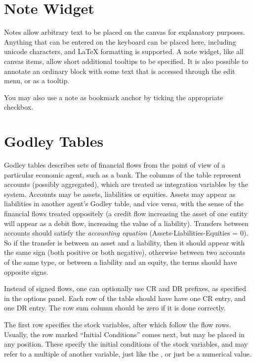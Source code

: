 \section{Note Widget}
\label{Notes}\label{Item} Notes allow arbitrary text to be
placed on the canvas for explanatory purposes. Anything that can be
entered on the keyboard can be placed here, including unicode
characters, and LaTeX formatting is supported. A note widget, like all
canvas items, allow short additional tooltips to be specified. It is
also possible to annotate an ordinary block with some text that is
accessed through the edit menu, or as a tooltip.

You may also use a note as bookmark anchor by ticking the appropriate
checkbox.

\section{Godley Tables}\label{godley}\label{GodleyIcon}

Godley tables describes sets of financial flows from the point of view
of a particular economic agent, such as a bank. The columns of the
table represent accounts (possibly aggregated), which are treated as
integration variables by the system. Accounts may be assets,
liabilities or equities. Assets may appear as liabilities in another
agent's Godley table, and vice versa, with the sense of the financial
flows treated oppositely (a credit flow increasing the asset of one
entity will appear as a debit flow, increasing the value of a
liability). Transfers between accounts should satisfy the {\em
  accounting equation}
(Assets-Liabilities-Equities = 0). So if the transfer is between an
asset and a liability, then it should appear with the same sign (both
positive or both negative), otherwise between two accounts of the same
type, or between a liability and an equity, the terms should have
opposite signs.

Instead of signed flows, one can optionally use CR and DR prefixes, as
specified in the options panel. Each row of the table should have have
one CR entry, and one DR entry. The row sum column should be zero if
it is done correctly.

The first row specifies the stock variables, after which follow the
flow rows. Usually, the row marked ``Initial Conditions'' comes next,
but may be placed in any position. These specify the initial
conditions of the stock variables, and may refer to a multiple of
another variable, just like the , or just be a numerical value.

